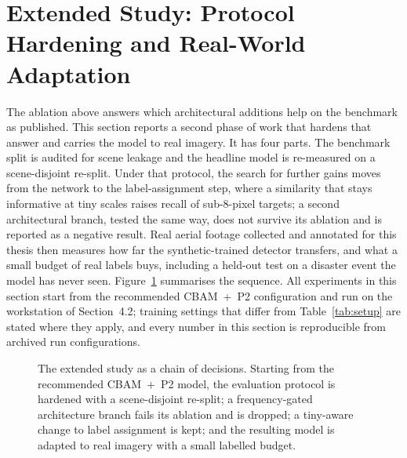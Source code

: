 \section{Extended Study: Protocol Hardening and Real-World Adaptation}
\label{sec:partb}
The ablation above answers which architectural additions help on the benchmark as
published. This section reports a second phase of work that hardens that answer
and carries the model to real imagery. It has four parts. The benchmark split is
audited for scene leakage and the headline model is re-measured on a
scene-disjoint re-split. Under that protocol, the search for further gains moves
from the network to the label-assignment step, where a similarity that stays
informative at tiny scales raises recall of sub-8-pixel targets; a second
architectural branch, tested the
same way, does not survive its ablation and is reported as a negative result.
Real aerial footage collected and annotated for this thesis then measures how far
the synthetic-trained detector transfers, and what a small budget of real labels
buys, including a held-out test on a disaster event the model has never seen.
Figure~\ref{fig:partbchain} summarises the sequence. All experiments in this
section start from the recommended CBAM~+~P2 configuration and run on the
workstation of Section~4.2; training settings that differ from
Table~\ref{tab:setup} are stated where they apply, and every number in this
section is reproducible from archived run configurations.

\begin{figure}[tbp]
  \centering
  \caption{The extended study as a chain of decisions. Starting from the
  recommended CBAM~+~P2 model, the evaluation protocol is hardened with a
  scene-disjoint re-split; a frequency-gated architecture branch fails its
  ablation and is dropped; a tiny-aware change to label assignment is kept; and
  the resulting model is adapted to real imagery with a small labelled budget.}
  \label{fig:partbchain}
\end{figure}

